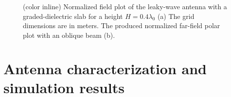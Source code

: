 \begin{figure} [h!]
\centering
\noindent
\hspace*{\fill}%
  \mbox{}
\hspace*{\fill}%
 \mbox{}
 	\hspace*{\fill}%
	

  \caption[Oblique radiation from the antenna with a slab height $H= 0.4 \lambda_0$.]{(color inline) Normalized field plot of the leaky-wave antenna with a graded-dielectric slab for a height $H= 0.4 \lambda_0$ (a) The grid dimensions are in meters. The produced normalized far-field polar plot with an oblique beam (b).}
\label{fig:field_oblique}
\end{figure}



\section{Antenna characterization and simulation results}


